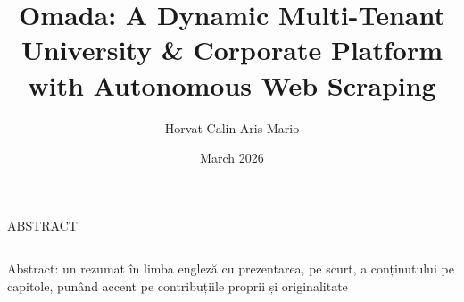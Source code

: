 \documentclass[12pt]{report}
\begin{document}
\title{Omada: A Dynamic Multi-Tenant University \& Corporate Platform with Autonomous Web Scraping}
\author{Horvat Calin-Aris-Mario}
\date{March 2026}
				
\maketitle


\newpage
\thispagestyle{empty}
\mbox{}
\newpage
{} 

\cleardoublepage
ABSTRACT
\vspace{0.5cm}	
\hrule
\vspace{0.5cm}	

Abstract: un rezumat în limba engleză cu prezentarea, pe scurt, a conținutului pe capitole, punând accent pe contribuțiile proprii și originalitate



\tableofcontents

\newpage
{}











\end{document}
